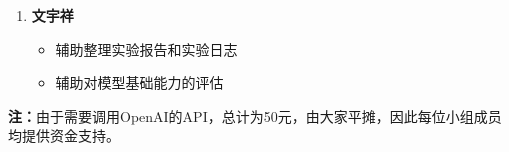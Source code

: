 \documentclass[
    linespread = 1.25
]{ctexart}
\begin{document}
\begin{enumerate}
  \item \textbf{文宇祥}
        \begin{itemize}
          \item 辅助整理实验报告和实验日志
          \item 辅助对模型基础能力的评估
        \end{itemize}
\end{enumerate}

\textbf{注：}由于需要调用OpenAI的API，总计为50元，由大家平摊，因此每位小组成员均提供资金支持。


\end{document}
